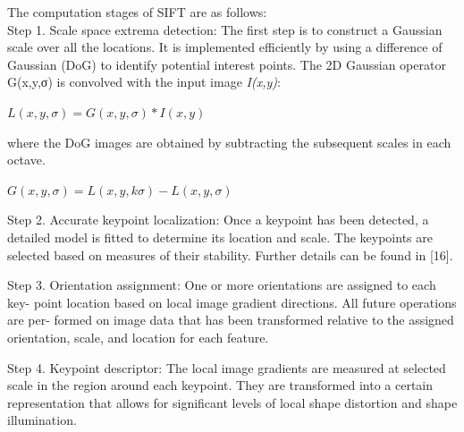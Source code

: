  The computation stages of SIFT are as follows: \\
Step 1. Scale space extrema detection: The first step is to construct a Gaussian scale over all the locations. It is implemented efficiently by using a difference of Gaussian (DoG) to identify potential interest points. The 2D Gaussian operator G(x,y,σ) is convolved with the input image \textit{I(x,y)}:
\begin{center}
	$L(x,y,\sigma) = G(x,y,\sigma) * I(x,y)$
\end{center}
where the  DoG images are obtained by subtracting the subsequent scales in each octave.
\begin{center}
	$G(x,y,\sigma) = L(x,y,k\sigma) - L(x,y,\sigma)$
\end{center}

Step 2. Accurate keypoint localization: Once a keypoint has been detected, a detailed model is fitted to determine its location and scale. The keypoints are selected based on measures of their stability. Further details can be found in [16]. 

Step 3. Orientation assignment: One or more orientations are assigned to each key- point location based on local image gradient directions. All future operations are per- formed on image data that has been transformed relative to the assigned orientation, scale, and location for each feature.

Step 4. Keypoint descriptor: The local image gradients are measured at selected scale in the region around each keypoint. They are transformed into a certain representation that allows for significant levels of local shape distortion and shape illumination.

